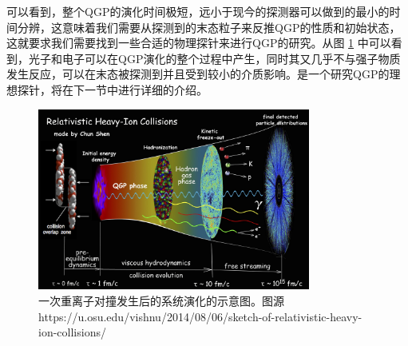 可以看到，整个QGP的演化时间极短，远小于现今的探测器可以做到的最小的时间分辨，这意味着我们需要从探测到的末态粒子来反推QGP的性质和初始状态，这就要求我们需要找到一些合适的物理探针来进行QGP的研究。从图 \ref{fig:HIC} 中可以看到，光子和电子可以在QGP演化的整个过程中产生，同时其又几乎不与强子物质发生反应，可以在末态被探测到并且受到较小的介质影响。是一个研究QGP的理想探针，将在下一节中进行详细的介绍。


\begin{figure}[htb]
    \begin{center}
    \includegraphics[width=0.8\textwidth,clip]{figures/Chapter1/little_bang-10wt2pd.jpeg}
    \end{center}
    \caption[相对论重离子演化示意图]{一次重离子对撞发生后的系统演化的示意图。图源https://u.osu.edu/vishnu/2014/08/06/sketch-of-relativistic-heavy-ion-collisions/}
    \label{fig:HIC}
\end{figure}